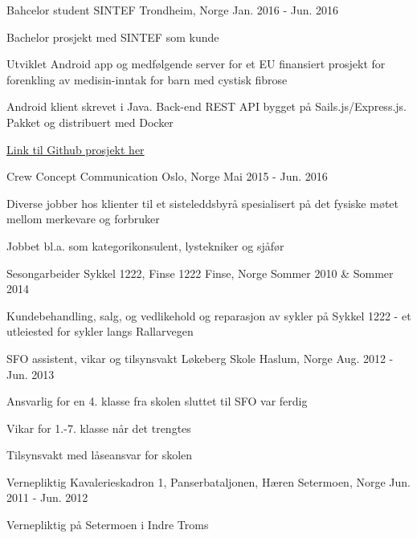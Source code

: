 \begin{cventries}
    \cventry
    {Bahcelor student}
    {SINTEF}
    {Trondheim, Norge}
    {Jan. 2016 - Jun. 2016}
    {
      \begin{cvitems}
        \item {Bachelor prosjekt med SINTEF som kunde}
        \item {Utviklet Android app og medfølgende server for et EU finansiert prosjekt for forenkling av medisin-inntak for barn med cystisk fibrose}
        \item {Android klient skrevet i Java. Back-end REST API bygget på Sails.js/Express.js. Pakket og distribuert med Docker}
        \item {\href{https://github.com/SINTEF-SIT/familyMedicineReminder}{Link til Github prosjekt her}}
      \end{cvitems}
    }
  \cventry
    {Crew}
    {Concept Communication}
    {Oslo, Norge}
    {Mai 2015 - Jun. 2016}
    {
      \begin{cvitems}
        \item {Diverse jobber hos klienter til et sisteleddsbyrå spesialisert på det fysiske møtet mellom merkevare og forbruker}
        \item {Jobbet bl.a. som kategorikonsulent, lystekniker og sjåfør}
      \end{cvitems} 
    }
  \cventry
    {Sesongarbeider}
    {Sykkel 1222, Finse 1222}
    {Finse, Norge}
    {Sommer 2010 \& Sommer 2014}
    {
      \begin{cvitems}
        \item {Kundebehandling, salg, og vedlikehold og reparasjon av sykler på Sykkel 1222 - et utleiested for sykler langs Rallarvegen}
      \end{cvitems}
    }
  \cventry
    {SFO assistent, vikar og tilsynsvakt}
    {Løkeberg Skole}
    {Haslum, Norge}
    {Aug. 2012 - Jun. 2013}
    {
      \begin{cvitems}
        \item {Ansvarlig for en 4. klasse fra skolen sluttet til SFO var ferdig}
        \item {Vikar for 1.-7. klasse når det trengtes}
        \item {Tilsynsvakt med låseansvar for skolen}
      \end{cvitems}
    }
  \cventry
    {Vernepliktig}
    {Kavalerieskadron 1, Panserbataljonen, Hæren}
    {Setermoen, Norge}
    {Jun. 2011 - Jun. 2012}
    {
      \begin{cvitems}
        \item {Vernepliktig på Setermoen i Indre Troms}

\end{cvitems}}
\end{cventries}
